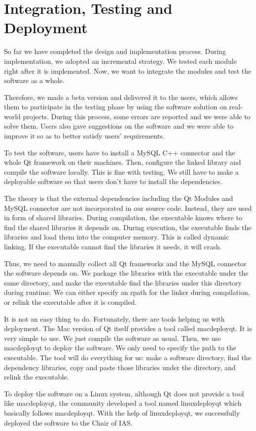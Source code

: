 \chapter{Integration, Testing and Deployment}
So far we have completed the design and implementation process. During implementation, we adopted an incremental strategy. We tested each module right after it is implemented. Now, we want to integrate the modules and test the software as a whole.

Therefore, we made a beta version and delivered it to the users, which allows them to participate in the testing phase by using the software solution on real-world projects. During this process, some errors are reported and we were able to solve them. Users also gave suggestions on the software and we were able to improve it so as to better satisfy users' requirements. 

To test the software, users have to install a MySQL C++ connector and the whole Qt framework on their machines. Then, configure the linked library and compile the software locally. This is fine with testing. We still have to make a deployable software so that users don't have to install the dependencies.

The theory is that the external dependencies including the Qt Modules and MySQL connector are not incorporated in our source code. Instead, they are used in form of shared libraries. During compilation, the executable knows where to find the shared libraries it depends on. During execution, the executable finds the libraries and load them into the computer memory. This is called dynamic linking. If the executable cannot find the libraries it needs, it will crash.

Thus, we need to manually collect all Qt frameworks and the MySQL connector the software depends on. We package the libraries with the executable under the same directory, and make the executable find the libraries under this directory during runtime. We can either specify an rpath for the linker during compilation, or relink the executable after it is compiled.

It is not an easy thing to do. Fortunately, there are tools helping us with deployment. The Mac version of Qt itself provides a tool called macdeployqt. It is very simple to use. We just compile the software as usual. Then, we use macdeployqt to deploy the software. We only need to specify the path to the executable. The tool will do everything for us: make a software directory, find the dependency libraries, copy and paste those libraries under the directory, and relink the executable.

To deploy the software on a Linux system, although Qt does not provide a tool like macdeployqt, the community developed a tool named linuxdeployqt which basically follows macdeployqt. With the help of linuxdeployqt, we successfully deployed the software to the Chair of IAS.